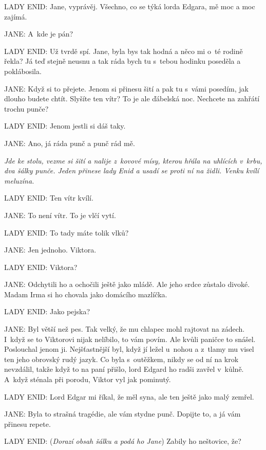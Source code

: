 \noindent
LADY ENID: Jane, vyprávěj. Všechno, co se týká lorda Edgara, mě moc a moc zajímá.

\noindent
JANE: A~kde je pán?

\noindent
LADY ENID: Už tvrdě spí. Jane, byla bys tak hodná a něco mi o~té rodině řekla? Já teď stejně neusnu a tak ráda bych tu s tebou hodinku poseděla a poklábosila.

\noindent
JANE: Když si to přejete. Jenom si přinesu šití a pak tu s vámi posedím, jak dlouho budete chtít. Slyšíte ten vítr? To je ale ďábelská noc. Nechcete na zahřátí trochu punče?

\noindent
LADY ENID: Jenom jestli si dáš taky.

\noindent
JANE: Ano, já ráda punč a punč rád mě.

\smallskip

\noindent
\textit{Jde ke stolu, vezme si šití a nalije z kovové mísy, kterou hřála na uhlících v krbu, dva šálky punče. Jeden přinese lady Enid a usadí se proti ní na židli. Venku kvílí meluzína.}

\smallskip

\noindent
LADY ENID: Ten vítr kvílí.

\noindent
JANE: To není vítr. To je vlčí vytí.

\noindent
LADY ENID: To tady máte tolik vlků?

\noindent
JANE: Jen jednoho. Viktora.

\noindent
LADY ENID: Viktora?

\noindent
JANE: Odchytili ho a ochočili ještě jako mládě. Ale jeho srdce zůstalo divoké. Madam Irma si ho chovala jako domácího mazlíčka.

\noindent
LADY ENID: Jako pejska?

\noindent
JANE: Byl větší než pes. Tak velký, že mu chlapec mohl rajtovat na zádech. I~když se to Viktorovi nijak nelíbilo, to vám povím. Ale kvůli paničce to snášel. Poslouchal jenom ji. Nejšťastnější byl, když jí ležel u~nohou a z tlamy mu visel ten jeho obrovský rudý jazyk. Co byla s outěžkem, nikdy se od ní na krok nevzdálil, takže když to na paní přišlo, lord Edgard ho radši zavřel v kůlně. A~když sténala při porodu, Viktor vyl jak pominutý.

\noindent
LADY ENID: Lord Edgar mi říkal, že měl syna, ale ten ještě jako malý zemřel.

\noindent
JANE: Byla to strašná tragédie, ale vám stydne punč. Dopijte to, a já vám přinesu repete.

\noindent
LADY ENID: (\textit{Dorazí obsah šálku a podá ho Jane}) Zabily ho neštovice, že?

